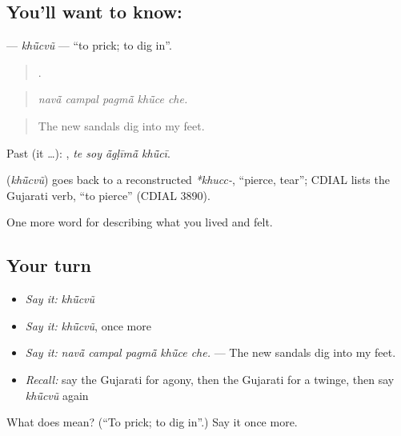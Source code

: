 \subsection*{You'll want to know: }
\textbf{} — \emph{khū̃cvũ} — \textquotedblleft{}to prick; to dig in\textquotedblright{}.

\begin{quote}
    .
\end{quote}

\begin{quote}
\emph{navā̃ campal pagmā̃ khū̃ce che.}
\end{quote}

\begin{quote}
The new sandals dig into my feet.
\end{quote}

Past (it …):    , \emph{te soy ā̃gḷīmā̃ khū̃cī}.

\begin{cousinweb}
\textbf{} (\emph{khū̃cvũ}) goes back to a reconstructed \emph{*khucc-}, \textquotedblleft{}pierce, tear\textquotedblright{}; CDIAL lists the Gujarati verb, \textquotedblleft{}to pierce\textquotedblright{} (CDIAL 3890).
\end{cousinweb}

\begin{grammarlens}[title={What you've built}]
One more word for describing what you lived and felt.
\end{grammarlens}

\subsection*{Your turn}
\begin{itemize}
\raggedright
  \item \emph{Say it:} \emph{khū̃cvũ}
  \item \emph{Say it:} \emph{khū̃cvũ}, once more
  \item \emph{Say it:} \emph{navā̃ campal pagmā̃ khū̃ce che.} — The new sandals dig into my feet.
  \item \emph{Recall:} say the Gujarati for agony, then the Gujarati for a twinge, then say \emph{khū̃cvũ} again
\end{itemize}

\begin{tcolorbox}[breakable,colback=teal!4,colframe=teal!35!black,title={Before you move on}]
What does  mean? (\textquotedblleft{}To prick; to dig in\textquotedblright{}.) Say it once more.
\end{tcolorbox}
